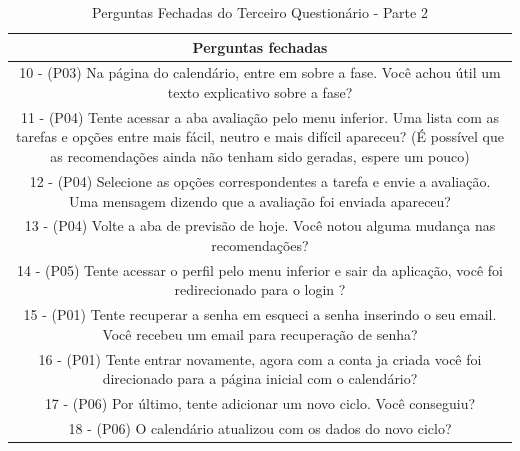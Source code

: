 \begin{table}[ht]
    \centering
    \caption{Perguntas Fechadas do Terceiro Questionário - Parte 2}
    \label{tab17}
    \begin{tabular}{c}
        \toprule
        \textbf{Perguntas fechadas} \\
        \midrule
        \begin{minipage} [t] {1\textwidth} 10 - (P03) Na página do calendário, entre em sobre a fase. Você achou útil um texto explicativo sobre a fase? \end{minipage}\\
        \midrule
        \begin{minipage} [t] {1\textwidth} 11 - (P04) Tente acessar a aba avaliação pelo menu inferior. Uma lista com as tarefas e opções entre mais fácil, neutro e mais difícil apareceu? (É possível que as recomendações ainda não tenham sido geradas, espere um pouco) \end{minipage}\\
        \midrule
        \begin{minipage} [t] {1\textwidth} 12 - (P04) Selecione as opções correspondentes a tarefa e envie a avaliação. Uma mensagem dizendo que a avaliação foi enviada apareceu? \end{minipage}\\
        \midrule
        \begin{minipage} [t] {1\textwidth} 13 - (P04) Volte a aba de previsão de hoje. Você notou alguma mudança nas recomendações? \end{minipage}\\
        \midrule
        \begin{minipage} [t] {1\textwidth} 14 - (P05) Tente acessar o perfil pelo menu inferior e sair da aplicação, você foi redirecionado para o login ? \end{minipage}\\
        \midrule
        \begin{minipage} [t] {1\textwidth} 15 - (P01) Tente recuperar a senha em esqueci a senha inserindo o seu email. Você recebeu um email para recuperação de senha? \end{minipage}\\
        \midrule
        \begin{minipage} [t] {1\textwidth} 16 - (P01) Tente entrar novamente, agora com a conta ja criada você foi direcionado para a página inicial com o calendário? \end{minipage}\\
        \midrule
        \begin{minipage} [t] {1\textwidth} 17 - (P06) Por último, tente adicionar um novo ciclo. Você conseguiu? \end{minipage}\\
        \midrule
        \begin{minipage} [t] {1\textwidth} 18 - (P06) O calendário atualizou com os dados do novo ciclo? \end{minipage}\\
        \bottomrule
    \end{tabular}
\end{table}


